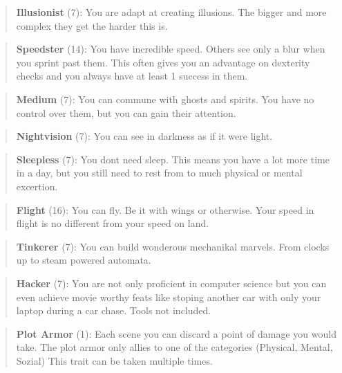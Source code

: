 \documentclass[11pt]{article}
\begin{document}
{\begin{multicols}{2}[]
\begin{quote}
\textbf{Illusionist} (7): You are adapt at creating illusions. The bigger and more complex they get the harder this is.
\end{quote}

\begin{quote}
\textbf{Speedster} (14): You have incredible speed. Others see only a blur when you sprint past them. This often gives you an advantage on dexterity checks and you always have at least 1 success in them.
\end{quote}

\begin{quote}
\textbf{Medium} (7): You can commune with ghosts and spirits. You have no control over them, but you can gain their attention.
\end{quote}

\begin{quote}
\textbf{Nightvision} (7): You can see in darkness as if it were light.
\end{quote}

\begin{quote}
\textbf{Sleepless} (7): You dont need sleep. This means you have a lot more time in a day, but you still need to rest from to much physical or mental excertion.
\end{quote}

\begin{quote}
\textbf{Flight} (16): You can fly. Be it with wings or otherwise. Your speed in flight is no different from your speed on land.
\end{quote}

\begin{quote}
\textbf{Tinkerer} (7): You can build wonderous mechanikal marvels. From clocks up to steam powered automata. 
\end{quote}

\begin{quote}
\textbf{Hacker} (7): You are not only proficient in computer science but you can even achieve movie worthy feats like stoping another car with only your laptop during a car chase. Tools not included.
\end{quote}

\begin{quote}
\textbf{Plot Armor} (1): Each scene you can discard a point of damage you would take. The plot armor only allies to one of the categories (Physical, Mental, Sozial) This trait can be taken multiple times.
\end{quote}



\end{multicols}}
\end{document}
